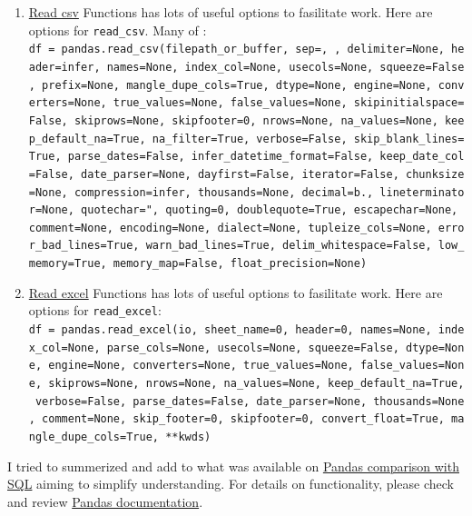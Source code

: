 \documentclass[11pt]{article}
\begin{document}
\begin{enumerate}
\def\labelenumi{\arabic{enumi}.}
\item
  \href{https://pandas.pydata.org/pandas-docs/stable/reference/api/pandas.read_csv.html}{Read
  csv} Functions has lots of useful options to fasilitate work. Here are
  options for \texttt{read\_csv}. Many of :
  \texttt{df\ =\ pandas.read\_csv(filepath\_or\_buffer,\ sep=\textquotesingle{},\ \textquotesingle{},\ delimiter=None,\ header=\textquotesingle{}infer\textquotesingle{},\ names=None,\ index\_col=None,\ usecols=None,\ squeeze=False,\ prefix=None,\ mangle\_dupe\_cols=True,\ dtype=None,\ engine=None,\ converters=None,\ true\_values=None,\ false\_values=None,\ skipinitialspace=False,\ skiprows=None,\ skipfooter=0,\ nrows=None,\ na\_values=None,\ keep\_default\_na=True,\ na\_filter=True,\ verbose=False,\ skip\_blank\_lines=True,\ parse\_dates=False,\ infer\_datetime\_format=False,\ keep\_date\_col=False,\ date\_parser=None,\ dayfirst=False,\ iterator=False,\ chunksize=None,\ compression=\textquotesingle{}infer\textquotesingle{},\ thousands=None,\ decimal=b\textquotesingle{}.\textquotesingle{},\ lineterminator=None,\ quotechar=\textquotesingle{}"\textquotesingle{},\ quoting=0,\ doublequote=True,\ escapechar=None,\ comment=None,\ encoding=None,\ dialect=None,\ tupleize\_cols=None,\ error\_bad\_lines=True,\ warn\_bad\_lines=True,\ delim\_whitespace=False,\ low\_memory=True,\ memory\_map=False,\ float\_precision=None)}
\item
  \href{https://pandas.pydata.org/pandas-docs/stable/reference/api/pandas.read_excel.html\#pandas.read_excel}{Read
  excel} Functions has lots of useful options to fasilitate work. Here
  are options for \texttt{read\_excel}:
  \texttt{df\ =\ pandas.read\_excel(io,\ sheet\_name=0,\ header=0,\ names=None,\ index\_col=None,\ parse\_cols=None,\ usecols=None,\ squeeze=False,\ dtype=None,\ engine=None,\ converters=None,\ true\_values=None,\ false\_values=None,\ skiprows=None,\ nrows=None,\ na\_values=None,\ keep\_default\_na=True,\ verbose=False,\ parse\_dates=False,\ date\_parser=None,\ thousands=None,\ comment=None,\ skip\_footer=0,\ skipfooter=0,\ convert\_float=True,\ mangle\_dupe\_cols=True,\ **kwds)}
\end{enumerate}

I tried to summerized and add to what was available on
\href{https://pandas.pydata.org/pandas-docs/stable/getting_started/comparison/comparison_with_sql.html}{Pandas
comparison with SQL} aiming to simplify understanding. For details on
functionality, please check and review
\href{http://pandas.pydata.org/pandas-docs/stable}{Pandas
documentation}.
\end{document}
